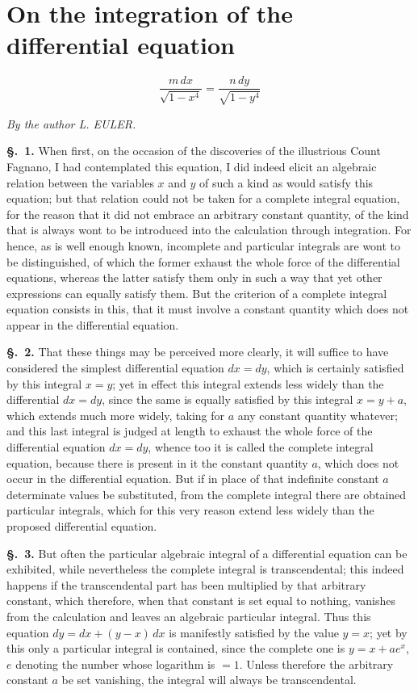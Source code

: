 \documentclass{article}
\begin{document}
\section*{On the integration of the differential equation}

\[ \frac{m\,dx}{\sqrt{1-x^{4}}} = \frac{n\,dy}{\sqrt{1-y^{4}}} \]

\emph{By the author L. EULER.}

\textbf{§.~1.} When first, on the occasion of the discoveries of the illustrious Count Fagnano, I
had contemplated this equation, I did indeed elicit an algebraic relation between the variables $x$
and $y$ of such a kind as would satisfy this equation; but that relation could not be taken for a
complete integral equation, for the reason that it did not embrace an arbitrary constant quantity,
of the kind that is always wont to be introduced into the calculation through integration. For
hence, as is well enough known, incomplete and particular integrals are wont to be distinguished,
of which the former exhaust the whole force of the differential equations, whereas the latter
satisfy them only in such a way that yet other expressions can equally satisfy them. But the
criterion of a complete integral equation consists in this, that it must involve a constant quantity
which does not appear in the differential equation.

\textbf{§.~2.} That these things may be perceived more clearly, it will suffice to have considered
the simplest differential equation $dx = dy$, which is certainly satisfied by this integral $x = y$;
yet in effect this integral extends less widely than the differential $dx = dy$, since the same is
equally satisfied by this integral $x = y + a$, which extends much more widely, taking for $a$ any
constant quantity whatever; and this last integral is judged at length to exhaust the whole force of
the differential equation $dx = dy$, whence too it is called the complete integral equation, because
there is present in it the constant quantity $a$, which does not occur in the differential equation.
But if in place of that indefinite constant $a$ determinate values be substituted, from the complete
integral there are obtained particular integrals, which for this very reason extend less widely than
the proposed differential equation.

\textbf{§.~3.} But often the particular algebraic integral of a differential equation can be
exhibited, while nevertheless the complete integral is transcendental; this indeed happens if the
transcendental part has been multiplied by that arbitrary constant, which therefore, when that
constant is set equal to nothing, vanishes from the calculation and leaves an algebraic particular
integral. Thus this equation $dy = dx + (y-x)\,dx$ is manifestly satisfied by the value $y = x$; yet
by this only a particular integral is contained, since the complete one is $y = x + ae^{x}$, $e$
denoting the number whose logarithm is $=1$. Unless therefore the arbitrary constant $a$ be set
vanishing, the integral will always be transcendental.
\end{document}
